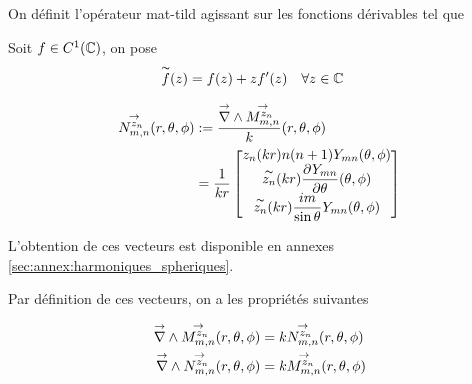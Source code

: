         \begin{defn}
            On définit l’opérateur \gls{mat-tild} agissant sur les fonctions dérivables tel que 

            Soit \(f \in C^1(\CC)\), on pose
            \begin{align*}
            &\tilde{f}(z)=f(z) + zf'(z)&& \forall z \in \CC
            \end{align*}
        \end{defn}

        \begin{align}
        \label{eq:defNnn}
          \Nmn[z_n](\rtp) &:= \frac{\vrot \Mmn[z_n]}{k}(\rtp) \\
          &= \frac{1}{kr}\begin{bmatrix}
            z_n(kr)n(n+1)Y_{mn}(\tp)
            \\
            \tilde{z_n}(kr)\ddr{\theta}{Y_{mn}}(\tp)
            \\
            \tilde{z_n}(kr)\frac{im}{\sin\theta}Y_{mn}(\tp)
          \end{bmatrix}
        \end{align}

        L'obtention de ces vecteurs est disponible en annexes \ref{sec:annex:harmoniques_spheriques}.

        Par définition de ces vecteurs, on a les propriétés suivantes
        \begin{prop}
            \label{prop:Mmn_Nmn_rot}
            \begin{align}
                \vrot \Mmn[z_n](\rtp) &= k\Nmn[z_n](\rtp)
                \\
                \vrot \Nmn[z_n](\rtp) &= k\Mmn[z_n](\rtp)
            \end{align}
        \end{prop}



